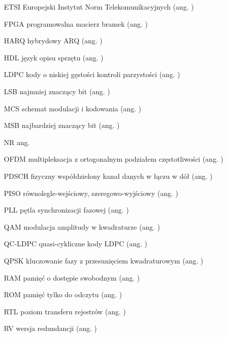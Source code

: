 \begin{itemize}
\item[ETSI] Europejski Instytut Norm Telekomunikacyjnych (ang. )

\item[FPGA] programowalna macierz bramek (ang. )

\item[HARQ] hybrydowy ARQ (ang. )
\item[HDL] język opisu sprzętu (ang. )

\item[LDPC] kody o niskiej gęstości kontroli parzystości (ang. )
\item[LSB] najmniej znaczący bit (ang. )

\item[MCS] schemat modulacji i kodowania (ang. )
\item[MSB] najbardziej znaczący bit (ang. )

\item[NR] ang. 

\item[OFDM] multipleksacja z ortogonalnym podziałem częstotliwości (ang. )

\item[PDSCH] fizyczny współdzielony kanał danych w łączu w dół (ang. )
\item[PISO] równolegle-wejściowy, szeregowo-wyjściowy (ang. )
\item[PLL] pętla synchronizacji fazowej (ang. )

\item[QAM] modulacja amplitudy w kwadraturze (ang. )
\item[QC-LDPC] quasi-cykliczne kody LDPC (ang. )
\item[QPSK] kluczowanie fazy z przesunięciem kwadraturowym (ang. )

\item[RAM] pamięć o dostępie swobodnym (ang. )
\item[ROM] pamięć tylko do odczytu (ang. )
\item[RTL] poziom transferu rejestrów (ang. )
\item[RV] wersja redundancji (ang. )


\end{itemize}
